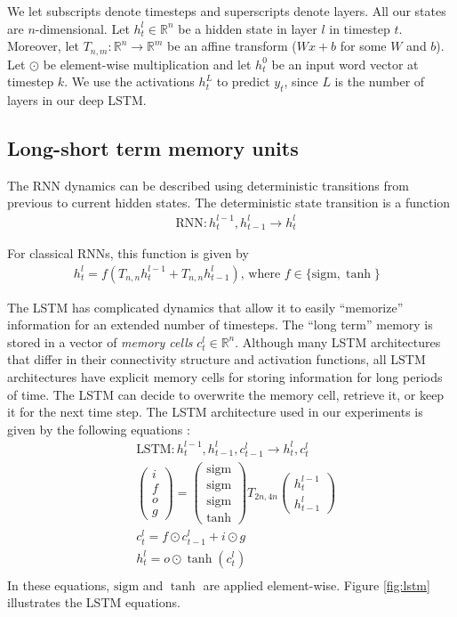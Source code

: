 \documentclass{article} %
\begin{document}
We let subscripts denote timesteps and superscripts denote 
layers.  All our states are $n$-dimensional.  Let $h^l_t
\in \mathbb{R}^{n}$ be a hidden state in layer $l$ in timestep
$t$. Moreover, let $T_{n,m}:\mathbb{R}^{n} \rightarrow \mathbb{R}^{m}$
be an affine transform ($Wx + b$ for some $W$ and $b$).
Let $\odot$ be element-wise multiplication and let $h^0_t$ be an
input word vector at timestep $k$.  We use the activations $h^{L}_t$ to predict $y_t$,
since $L$ is the number of layers in our deep LSTM.

\subsection{Long-short term memory units}
\label{sec:lstm}

The RNN dynamics can be described using deterministic transitions
from previous to current hidden states. 
The deterministic state transition is a function
\begin{align*}
  &\text{RNN} : h^{l-1}_t, h^l_{t-1} \rightarrow h^l_t
\end{align*}

For classical RNNs, this function is given by
\begin{align*}
  h^l_t = f(T_{n,n}h^{l-1}_t + T_{n,n}h^l_{t-1}) \text{, where $f \in \{\mathrm{sigm}, \tanh\}$ }
\end{align*}

The LSTM has complicated dynamics that allow it to
easily ``memorize'' information for an extended number of timesteps.  The
``long term'' memory is stored in a vector of \emph{memory cells}
$c^l_t \in \mathbb{R}^n$.  Although many LSTM architectures
that differ in their connectivity structure and activation functions,
all LSTM architectures have explicit memory cells for storing
information for long periods of time.  The LSTM can decide
to overwrite the memory cell, retrieve it, or keep it for the next time
step.  The LSTM architecture used in our experiments is given by the
following equations \cite{graves2013speech}:
\begin{align*}
&\text{LSTM} : h^{l-1}_t, h^l_{t-1}, c^l_{t - 1} \rightarrow h^l_t, c^l_t\\
&\begin{pmatrix}i\\f\\o\\g\end{pmatrix} =
  \begin{pmatrix}\mathrm{sigm}\\\mathrm{sigm}\\\mathrm{sigm}\\\tanh\end{pmatrix}
  T_{2n,4n}\begin{pmatrix}h^{l - 1}_t\\h^l_{t-1}\end{pmatrix}\\
&c^l_t = f \odot c^l_{t-1} + i \odot g\\
&h^l_t = o \odot \tanh(c^l_t)\\
\end{align*}
In these equations, $\mathrm{sigm}$ and $\tanh$ are applied
element-wise. Figure \ref{fig:lstm} illustrates the LSTM
equations.
\end{document}
